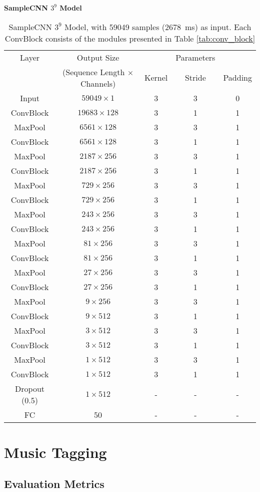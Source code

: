 \begin{table}
    \centering
    \textbf{SampleCNN $3^9$ Model} \\
    \begin{tabular}{ccccc}
        \toprule Layer & Output Size & & Parameters & \\
        & (Sequence Length $\times$ Channels) & Kernel & Stride & Padding \\\hline
        Input & $59049 \times 1$ & 3 & 3 & 0 \\\hline
        ConvBlock & $19683 \times 128$ & 3 & 1 & 1 \\
        MaxPool & $6561 \times 128$ & 3 & 3 & 1 \\\hline
        ConvBlock & $6561 \times 128$ & 3 & 1 & 1 \\
        MaxPool & $2187 \times 256$ & 3 & 3 & 1 \\\hline
        ConvBlock & $2187 \times 256$ & 3 & 1 & 1 \\
        MaxPool & $729 \times 256$ & 3 & 3 & 1 \\\hline
        ConvBlock & $729 \times 256$ & 3 & 1 & 1 \\
        MaxPool & $243 \times 256$ & 3 & 3 & 1 \\\hline
        ConvBlock & $243 \times 256$ & 3 & 1 & 1 \\
        MaxPool & $81 \times 256$ & 3 & 3 & 1 \\\hline
        ConvBlock & $81 \times 256$ & 3 & 1 & 1 \\
        MaxPool & $27 \times 256$ & 3 & 3 & 1 \\\hline
        ConvBlock & $27 \times 256$ & 3 & 1 & 1 \\
        MaxPool & $9 \times 256$ & 3 & 3 & 1 \\\hline
        ConvBlock & $9 \times 512$ & 3 & 1 & 1 \\
        MaxPool & $3 \times 512$ & 3 & 3 & 1 \\\hline
        ConvBlock & $3 \times 512$ & 3 & 1 & 1 \\
        MaxPool & $1 \times 512$ & 3 & 3 & 1 \\\hline
        ConvBlock & $1 \times 512$ & 3 & 1 & 1 \\
        Dropout (0.5) & $1 \times 512$ & - & - & - \\\hline
        FC & 50 & - & - & - \\
        \bottomrule
    \end{tabular}
    \caption{SampleCNN $3^9$ Model, with 59049 samples (2678~ms) as input. Each ConvBlock consists of the modules presented in Table \ref{tab:conv_block}}
    \label{tab:samplecnn_model}
\end{table}


\section{Music Tagging}

\subsection{Evaluation Metrics}
